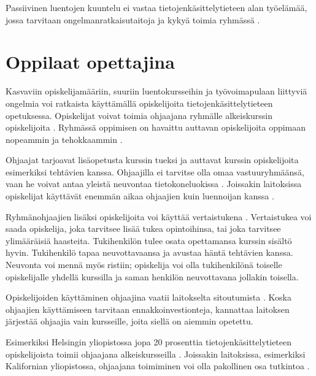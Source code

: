 \documentclass[finnish]{tktltiki2}
\theoremstyle{definition}
\theoremstyle{remark}
\begin{document}
Passiivinen luentojen kuuntelu ei vastaa tietojenkäsittelytieteen alan työelämää, jossa tarvitaan ongelmanratkaisutaitoja ja kykyä toimia ryhmässä \cite{Vihavainen}. \par








\section{Oppilaat opettajina}
Kasvaviin opiskelijamääriin, suuriin luentokursseihin ja työvoimapulaan liittyviä ongelmia voi ratkaista käyttämällä opiskelijoita tietojenkäsittelytieteen opetuksessa. Opiskelijat voivat toimia ohjaajana ryhmälle alkeiskurssin o\-pis\-ke\-li\-joi\-ta \cite{Reges88}. Ryhmässä oppimisen on havaittu auttavan opiskelijoita oppimaan nopeammin ja tehokkaammin \cite{Yadin11}. \par

Ohjaajat tarjoavat lisäopetusta kurssin tueksi ja auttavat kurssin opiskelijoita esimerkiksi tehtävien kanssa. Ohjaajilla ei tarvitse olla omaa vastuuryhmäänsä, vaan he voivat antaa yleistä neuvontaa tietokoneluokissa \cite{Vikberg, Vihavainen}. Joissakin laitoksissa opiskelijat käyttävät enemmän aikaa ohjaajien kuin luennoijan kanssa \cite{Patitsas12_3}. \par

Ryhmänohjaajien lisäksi opiskelijoita voi käyttää vertaistukena \cite{Tashakkori05}. Vertaistukea voi saada opiskelija, joka tarvitsee lisää tukea opintoihinsa, tai joka tarvitsee ylimääräisiä haasteita. Tukihenkilön tulee osata opettamansa  kurssin sisältö hyvin. Tukihenkilö tapaa neuvottavaansa ja avustaa häntä tehtävien kanssa. Neuvonta voi mennä myös ristiin; opiskelija voi olla tukihenkilönä toiselle opiskelijalle yhdellä kurssilla ja saman henkilön neuvottavana jollakin toisella. \par

Opiskelijoiden käyttäminen ohjaajina vaatii laitokselta sitoutumista \cite{Kopp00}. Koska ohjaajien käyttämiseen tarvitaan ennakkoinvestionteja, kannattaa laitoksen järjestää ohjaajia vain kursseille, joita siellä on aiemmin opetettu.  \par

Esimerkiksi Helsingin yliopistossa jopa 20 prosenttia tie\-to\-jen\-kä\-sit\-te\-ly\-tie\-teen opiskelijoista toimii ohjaajana alkeiskursseilla \cite{Vihavainen}. Joissakin laitoksissa, esimerkiksi Kalifornian yliopistossa, ohjaajana toimiminen voi olla pakollinen osa tutkintoa \cite{Kay95}.  \par
\end{document}
